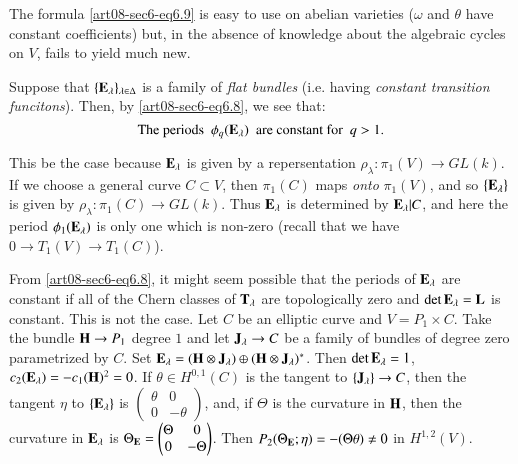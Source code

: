 \begin{remark*}
The formula \eqref{art08-sec6-eq6.9} is easy to use on abelian varieties ($\omega$ and $\theta$ have constant coefficients) but, in the absence of knowledge about the algebraic cycles on $V$, fails to yield much new.
\end{remark*}

\setcounter{definition}{1}
\begin{example}\label{art08-sec6-exam2}
Suppose that $\{\mathbf{E}_{\lambda}\}_{\lambda\in \Delta}$ is a family of {\em flat bundles} (i.e. having {\em constant transition funcitons}). Then, by \eqref{art08-sec6-eq6.8}, we see that:
\begin{equation}
\text{The periods~ } \phi_{q}(\mathbf{E}_{\lambda})\text{~ are constant for~ } q>1.\label{art08-sec6-eq6.10}
\end{equation}
\end{example}

\begin{remark*}
This be the case because $\mathbf{E}_{\lambda}$ is given by a repersentation $\rho_{\lambda}:\pi_{1}(V)\to GL(k)$. If we choose a general curve $C\subset V$, then $\pi_{1}(C)$ maps {\em onto} $\pi_{1}(V)$, and so $\{\mathbf{E}_{\lambda}\}$ is given by $\rho_{\lambda}:\pi_{1}(C)\to GL(k)$. Thus $\mathbf{E}_{\lambda}$ is determined by $\mathbf{E}_{\lambda}|C$, and here the period $\phi_{1}(\mathbf{E}_{\lambda})$ is only one which is non-zero (recall that we have $0\to T_{1}(V)\to T_{1}(C)$).
\end{remark*}

\begin{example}\label{art08-sec6-exam3}
From \eqref{art08-sec6-eq6.8}, it might seem possible that the periods of $\mathbf{E}_{\lambda}$ are constant if all of the Chern classes of $\mathbf{T}_{\lambda}$ are topologically zero and $\det \mathbf{E}_{\lambda}=\mathbf{L}$ is constant. This is not the case. Let $C$ be an elliptic curve and $V=P_{1}\times C$. Take the bundle $\mathbf{H}\to P_{1}$ degree $1$ and let $\mathbf{J}_{\lambda}\to C$ be a family of bundles of degree zero parametrized by $C$. Set $\mathbf{E}_{\lambda}=(\mathbf{H}\otimes \mathbf{J}_{\lambda})\oplus (\mathbf{H}\otimes \mathbf{J}_{\lambda})^{*}$. Then $\det \mathbf{E}_{\lambda}=1$, $c_{2}(\mathbf{E}_{\lambda})=-c_{1}(\mathbf{H})^{2}=0$. If $\theta\in H^{0,1}(C)$ is the tangent to $\{\mathbf{J}_{\lambda}\}\to C$, then the tangent $\eta$ to $\{\mathbf{E}_{\lambda}\}$ is $\left(\begin{matrix} \theta & 0\\ 0 & -\theta\end{matrix}\right)$, and, if $\Theta$ is the curvature in $\mathbf{H}$, then the curvature in $\mathbf{E}_{\lambda}$ is $\Theta_{\mathbf{E}}=\left(\begin{matrix} \Theta & 0\\ 0 & -\Theta\end{matrix}\right)$. Then $P_{2}(\Theta_{\mathbf{E}};\eta)=-(\Theta\theta)\neq 0$ in $H^{1,2}(V)$.
\end{example}

